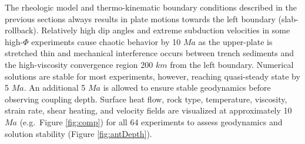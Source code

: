 The rheologic model and thermo-kinematic boundary conditions described in the previous sections always results in plate motions towards the left boundary (slab-rollback). Relatively high dip angles and extreme subduction velocities in some high-\(\Phi\) experiments cause chaotic behavior by 10 \(Ma\) as the upper-plate is stretched thin and mechanical interference occurs between trench sediments and the high-viscosity convergence region 200 \(km\) from the left boundary. Numerical solutions are stable for most experiments, however, reaching quasi-steady state by 5 \(Ma\). An additional 5 \(Ma\) is allowed to ensure stable geodynamics before observing coupling depth. Surface heat flow, rock type, temperature, viscosity, strain rate, shear heating, and velocity fields are visualized at approximately 10 \(Ma\) (e.g.~Figure \ref{fig:comp}) for all 64 experiments to assess geodynamics and solution stability (Figure \ref{fig:antDepth}).

